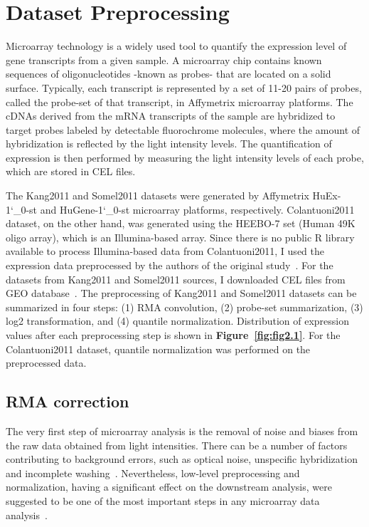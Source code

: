 \section{Dataset Preprocessing}
Microarray technology is a widely used tool to quantify the expression level of gene transcripts from a given sample. 
A microarray chip contains known sequences of oligonucleotides -known as probes- that are located on a solid surface.
Typically, each transcript is represented by a set of 11-20 pairs of probes, called the probe-set of that transcript, in Affymetrix microarray platforms.
The cDNAs derived from the mRNA transcripts of the sample are hybridized to target probes labeled by detectable fluorochrome molecules, 
where the amount of hybridization is reflected by the light intensity levels.
The quantification of expression is then performed by measuring the light intensity levels of each probe, which are stored in CEL files.

The Kang2011 and Somel2011 datasets were generated by Affymetrix HuEx-1\char`_0-st and HuGene-1\char`_0-st microarray platforms, respectively. 
Colantuoni2011 dataset, on the other hand, was generated using the HEEBO-7 set (Human 49K oligo array), which is an Illumina-based array. 
Since there is no public R library available to process Illumina-based data from Colantuoni2011, 
I used the expression data preprocessed by the authors of the original study~\cite{Colantuoni2011}. 
For the datasets from Kang2011 and Somel2011 sources, I downloaded CEL files from GEO database~\cite{Barrett2013}. 
The preprocessing of Kang2011 and Somel2011 datasets can be summarized in four steps: (1) RMA convolution, (2) probe-set summarization,
(3) log2 transformation, and (4) quantile normalization. 
Distribution of expression values after each preprocessing step is shown in \textbf{Figure~\ref{fig:fig2.1}}.
For the Colantuoni2011 dataset, quantile normalization was performed on the preprocessed data.

\subsection{RMA correction}
The very first step of microarray analysis is the removal of noise and biases from the raw data obtained from light intensities.
There can be a number of factors contributing to background errors, such as optical noise, unspecific hybridization and incomplete washing~\cite{Bengtsson2006}. 
Nevertheless, low-level preprocessing and normalization, having a significant effect on the downstream analysis, 
were suggested to be one of the most important steps in any microarray data analysis~\cite{Bengtsson2006}.


